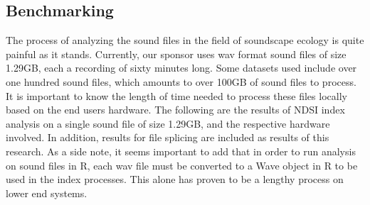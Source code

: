 \subsection{Benchmarking}
The process of analyzing the sound files in the field of soundscape ecology is quite painful as it stands. Currently, our sponsor uses wav format sound files of size 1.29GB, each a recording of sixty minutes long. Some datasets used include over one hundred sound files, which amounts to over 100GB of sound files to process. It is important to know the length of time needed to process these files locally based on the end user\textquotesingle s hardware. The following are the results of NDSI index analysis on a single sound file of size 1.29GB, and the respective hardware involved. In addition, results for file splicing are included as results of this research. As a side note, it seems important to add that in order to run analysis on sound files in R, each wav file must be converted to a Wave object in R to be used in the index processes. This alone has proven to be a lengthy process on lower end systems.\\




